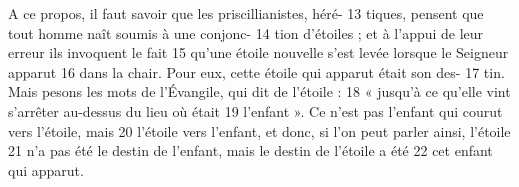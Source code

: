 A ce propos, il faut savoir que les priscillianistes, héré-	 
13	 	tiques, pensent que tout homme naît soumis à une conjonc-	 
14	 	tion d'étoiles ; et à l'appui de leur erreur ils invoquent le fait	 
15	 	qu'une étoile nouvelle s'est levée lorsque le Seigneur apparut	 
16	 	dans la chair. Pour eux, cette étoile qui apparut était son des-	 
17	 	tin. Mais pesons les mots de l'Évangile, qui dit de l'étoile :	 
18	 	« jusqu'à ce qu'elle vint s'arrêter au-dessus du lieu où était	 
19	 	l'enfant ». Ce n'est pas l'enfant qui courut vers l'étoile, mais	 
20	 	l'étoile vers l'enfant, et donc, si l'on peut parler ainsi, l'étoile	 
21	 	n'a pas été le destin de l'enfant, mais le destin de l'étoile a été	 
22	 	cet enfant qui apparut.